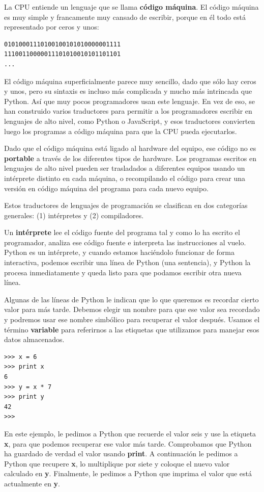 La CPU entiende un lenguaje que se llama {\bf código máquina}. El código
máquina es muy simple y francamente muy cansado de escribir, porque
en él todo está representado por ceros y unos:

\beforeverb
\begin{verbatim}
01010001110100100101010000001111
11100110000011101010010101101101
...
\end{verbatim}
\afterverb
%
El código máquina superficialmente parece muy sencillo, dado que sólo hay
ceros y unos, pero su sintaxis es incluso más complicada
y mucho más intrincada que Python. Así que muy pocos programadores
usan este lenguaje. En vez de eso, se han construido varios traductores para
permitir a los programadores escribir en lenguajes de alto nivel, como Python
o JavaScript, y esos traductores convierten luego los programas a código máquina
para que la CPU pueda ejecutarlos.

Dado que el código máquina está ligado al hardware del equipo, ese código
no es {\bf portable} a través de los diferentes tipos de hardware. Los programas escritos
en lenguajes de alto nivel pueden ser trasladados a diferentes equipos usando
un intérprete distinto en cada máquina, o recompilando el código para crear
una versión en código máquina del programa para cada nuevo equipo.

Estos traductores de lenguajes de programación se clasifican en dos categorías generales:
(1) intérpretes y (2) compiladores.

Un {\bf intérprete} lee el código fuente del programa tal y como lo ha escrito
el programador, analiza ese código fuente e interpreta las instrucciones al vuelo.
Python es un intérprete, y cuando estamos haciéndolo funcionar de forma interactiva,
podemos escribir una línea de Python (una sentencia), y Python la procesa inmediatamente
y queda listo para que podamos escribir otra nueva línea.

Algunas de las líneas de Python le indican que lo que queremos es recordar cierto
valor para más tarde. Debemos elegir un nombre para que ese valor sea recordado y
podremos usar ese nombre simbólico para recuperar el valor después. Usamos el
término {\bf variable} para referirnos a las etiquetas que utilizamos para manejar esos
datos almacenados.

\beforeverb
\begin{verbatim}
>>> x = 6
>>> print x
6
>>> y = x * 7
>>> print y
42
>>> 
\end{verbatim}
\afterverb
%
En este ejemplo, le pedimos a Python que recuerde el valor seis y use la etiqueta {\bf x},
para que podemos recuperar ese valor más tarde. Comprobamos que Python ha guardado de
verdad el valor usando {\bf print}. A continuación le pedimos a Python que recupere {\bf x},
lo multiplique por siete y coloque el nuevo valor calculado en {\bf y}.
Finalmente, le pedimos a Python que imprima el valor que está actualmente en {\bf y}.


